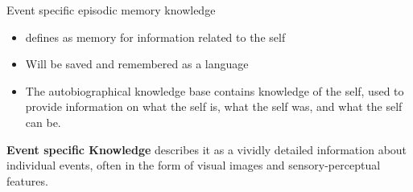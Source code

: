 \begin{frame}[allowframebreaks]{Event specific episodic memory knowledge}
    \begin{itemize}
        \item \cite{brewer-1986-what-is-autobiographical-memory} defines as memory for information related to the self
        \item Will be saved and remembered as a language
        \item The autobiographical knowledge base contains knowledge of the self, used to provide information on what the self is, what the self was, and what the self can be.
    \end{itemize}
    
    
    \textbf{Event specific Knowledge}
        \cite{pillemer-2001-momentous-events-and-the-life-story} describes it as a vividly detailed information about individual events, often in the form of visual images and sensory-perceptual features.

\end{frame}